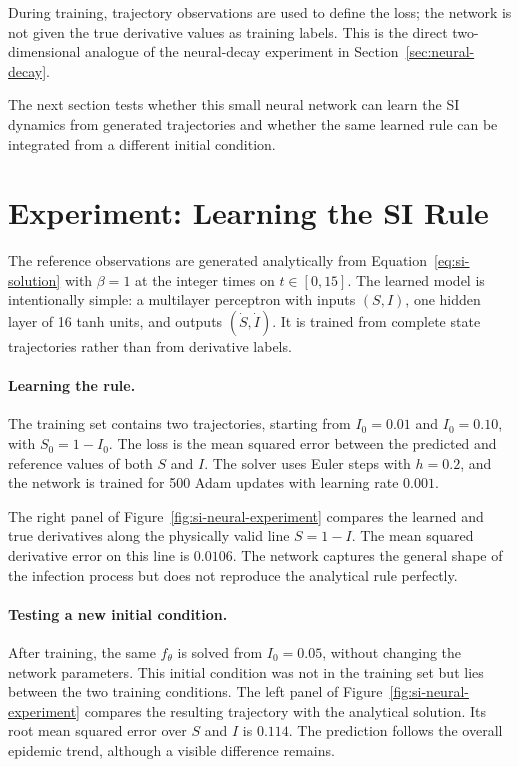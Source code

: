 \documentclass[11pt,a4paper]{article}
\begin{document}
During training, trajectory observations are used to define the loss; the
network is not given the true derivative values as training labels. This is
the direct two-dimensional analogue of the neural-decay experiment in
Section~\ref{sec:neural-decay}.

The next section tests whether this small neural network can learn the SI
dynamics from generated trajectories and whether the same learned rule can be
integrated from a different initial condition.

\section{Experiment: Learning the SI Rule}
\label{sec:si-experiments}

The reference observations are generated analytically from
Equation~\eqref{eq:si-solution} with $\beta=1$ at the integer times on
$t\in[0,15]$. The learned model is intentionally simple: a multilayer
perceptron with inputs $(S,I)$, one hidden layer of 16 tanh units, and outputs
$(\dot S,\dot I)$. It is trained from complete state trajectories rather than
from derivative labels.

\paragraph{Learning the rule.}

The training set contains two trajectories, starting from $I_0=0.01$ and
$I_0=0.10$, with $S_0=1-I_0$. The loss is the mean squared error between the
predicted and reference values of both $S$ and $I$. The solver uses Euler steps
with $h=0.2$, and the network is trained for 500 Adam updates with learning
rate $0.001$.

The right panel of Figure~\ref{fig:si-neural-experiment} compares the learned
and true derivatives along the physically valid line $S=1-I$. The mean squared
derivative error on this line is $0.0106$. The network captures the general
shape of the infection process but does not reproduce the analytical rule
perfectly.

\paragraph{Testing a new initial condition.}
\label{sec:si-new-ic}

After training, the same $f_\theta$ is solved from $I_0=0.05$, without changing
the network parameters. This initial condition was not in the training set but
lies between the two training conditions. The left panel of
Figure~\ref{fig:si-neural-experiment} compares the resulting trajectory with
the analytical solution. Its root mean squared error over $S$ and $I$ is
$0.114$. The prediction follows the overall epidemic trend, although a visible
difference remains.
\end{document}
